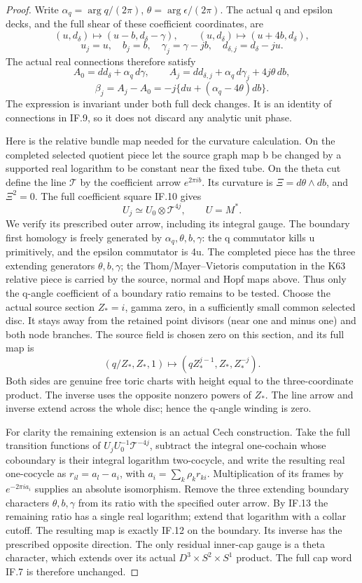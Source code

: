 \begin{proof}
Write \(\alpha_q=\arg q/(2\pi)\),
\(\theta=\arg\epsilon/(2\pi)\).  The actual q and epsilon
decks, and the full shear of these coefficient coordinates, are
\[
 (u,d_\delta)\mapsto(u-b,d_\delta-\gamma),\qquad
 (u,d_\delta)\mapsto(u+4b,d_\delta),
\]
\[
 u_j=u,\quad b_j=b,\quad\gamma_j=\gamma-jb,\quad
 d_{\delta,j}=d_\delta-ju.
 \tag{IF.10}
\]
The actual real connections therefore satisfy
\[
 A_0=dd_\delta+\alpha_q\,d\gamma,\qquad
 A_j=dd_{\delta,j}+\alpha_q\,d\gamma_j+4j\theta\,db,
\]
\[
 \beta_j=A_j-A_0=-j\{du+(\alpha_q-4\theta)db\}.
 \tag{IF.11}
\]
The expression is invariant under both full deck changes.  It is an
identity of connections in IF.9, so it does not discard any analytic
unit phase.

Here is the relative bundle map needed for the curvature calculation.
On the completed selected quotient piece let the source graph map b
be changed by a supported real logarithm to be constant near the fixed
tube.  On the theta cut define the line \(\mathcal T\) by the
coefficient arrow \(e^{2\pi i b}\).  Its curvature is
\(\Xi=d\theta\wedge db\), and \(\Xi^2=0\).  The full coefficient
square IF.10 gives
\[
                  U_j\simeq U_0\otimes\mathcal T^{4j},
                  \qquad U=M^*.
 \tag{IF.12}
\]
We verify its prescribed outer arrow, including its integral gauge.
The boundary first homology is freely generated by
\(\alpha_q,\theta,b,\gamma\): the q commutator kills u
primitively, and the epsilon commutator is 4u.  The completed piece
has the three extending generators \(\theta,b,\gamma\); the
Thom/Mayer--Vietoris computation in the K63 relative piece is carried
by the source, normal and Hopf maps above.  Thus only the q-angle
coefficient of a boundary ratio remains to be tested.  Choose the
actual source section \(Z_*=i\), gamma zero, in a sufficiently
small common selected disc.  It stays away from the retained point
divisors (near one and minus one) and both node branches.  The source
field is chosen zero on this section, and its full map is
\[
 (q/Z_*,Z_*,1)\longmapsto
                  (qZ_*^{j-1},Z_*,Z_*^{-j}).
 \tag{IF.13}
\]
Both sides are genuine free toric charts with height equal to the
three-coordinate product.  The inverse uses the opposite nonzero
powers of \(Z_*\).  The line arrow and inverse extend across the whole
disc; hence the q-angle winding is zero.

For clarity the remaining extension is an actual Cech construction.
Take the full transition functions of
\(U_jU_0^{-1}\mathcal T^{-4j}\), subtract the integral
one-cochain whose coboundary is their integral logarithm two-cocycle,
and write the resulting real one-cocycle as
\(r_{il}=a_l-a_i\), with
\(a_i=\sum_k\rho_k r_{ki}\).  Multiplication of its frames by
\(e^{-2\pi i a_i}\) supplies an absolute isomorphism.  Remove the
three extending boundary characters \(\theta,b,\gamma\) from its
ratio with the specified outer arrow.  By IF.13 the remaining ratio
has a single real logarithm; extend that logarithm with a collar
cutoff.  The resulting map is exactly IF.12 on the boundary.  Its
inverse has the prescribed opposite direction.  The only residual
inner-cap gauge is a theta character, which extends over its actual
\(D^3\times S^2\times S^1\) product.  The full cap word IF.7 is
therefore unchanged.


\end{proof}
